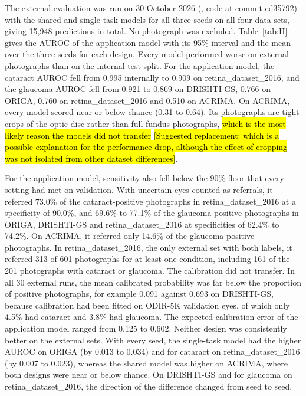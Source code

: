 \documentclass[conference,a4paper]{IEEEtran}
\newcommand{\proposedreplacement}[1]{{\sethlcolor{reviewred}\hl{#1}}}
\newcommand{\suggestedwording}[1]{{\sethlcolor{reviewgreen}\hl{[Suggested replacement: #1]}}}
\begin{document}
The external evaluation was run on 30 October 2026 (,
code at commit cd35792) with the shared and single-task models for all three seeds on all four data
sets, giving 15,948 predictions in total. No photograph was excluded. Table~\ref{tab:II} gives the
AUROC of the application model with its 95\% interval and the mean over the three seeds for each
design. Every model performed worse on external photographs than on the internal test split. For the
application model, the cataract AUROC fell from 0.995 internally to 0.909 on retina\_dataset\_2016,
and the glaucoma AUROC fell from 0.921 to 0.869 on DRISHTI-GS, 0.766 on ORIGA, 0.760 on
retina\_dataset\_2016 and 0.510 on ACRIMA. On ACRIMA, every model scored near or below chance (0.31
to 0.64). Its photographs are tight crops of the optic disc rather than full fundus photographs,
\proposedreplacement{which is the most likely reason the models did not transfer} \suggestedwording{which is a possible explanation for the performance drop, although the effect of cropping was not isolated from other dataset differences}.

For the application model, sensitivity also fell below the 90\% floor that every setting had met on
validation. With uncertain eyes counted as referrals, it referred 73.0\% of the cataract-positive
photographs in retina\_dataset\_2016 at a specificity of 90.0\%, and 69.6\% to 77.1\% of the
glaucoma-positive photographs in ORIGA, DRISHTI-GS and retina\_dataset\_2016 at specificities of
62.4\% to 74.2\%. On ACRIMA, it referred only 14.6\% of the glaucoma-positive photographs. In
retina\_dataset\_2016, the only external set with both labels, it referred 313 of 601 photographs
for at least one condition, including 161 of the 201 photographs with cataract or glaucoma. The
calibration did not transfer. In all 30 external runs, the mean calibrated probability was far below
the proportion of positive photographs, for example 0.091 against 0.693 on DRISHTI-GS, because
calibration had been fitted on ODIR-5K validation eyes, of which only 4.5\% had cataract and 3.8\%
had glaucoma. The expected calibration error of the application model ranged from 0.125 to 0.602.
Neither design was consistently better on the external sets. With every seed, the single-task model
had the higher AUROC on ORIGA (by 0.013 to 0.034) and for cataract on retina\_dataset\_2016 (by
0.007 to 0.023), whereas the shared model was higher on ACRIMA, where both designs were near or
below chance. On DRISHTI-GS and for glaucoma on retina\_dataset\_2016, the direction of the
difference changed from seed to seed.
\end{document}
